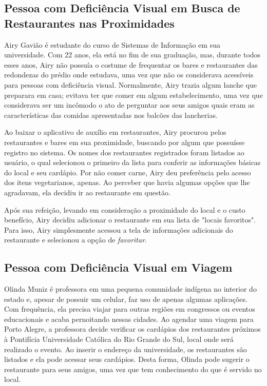 \subsection{Pessoa com Deficiência Visual em Busca de Restaurantes nas Proximidades}
Airy Gavião é estudante do curso de Sistemas de Informação em sua universidade. Com 22 anos, ela está no fim de sua graduação, mas, durante todos esses anos, Airy não possuía o costume de frequentar os bares e restaurantes das redondezas do prédio onde estudava, uma vez que não os considerava acessíveis para pessoas com deficiência visual. Normalmente, Airy trazia algum lanche que preparara em casa; evitava ter que comer em algum estabelecimento, uma vez que considerava ser um incômodo o ato de perguntar aos seus amigos quais eram as características das comidas apresentadas nos balcões das lancherias. 

Ao baixar o aplicativo de auxílio em restaurantes, Airy procurou pelos restaurantes e bares em sua proximidade, buscando por algum que possuísse registro no sistema. Os nomes dos restaurantes registrados foram listados ao usuário, o qual selecionou o primeiro da lista para conferir as informações básicas do local e seu cardápio. Por não comer carne, Airy deu preferência pelo acesso dos itens vegetarianos, apenas. Ao perceber que havia algumas opções que lhe agradavam, ela decidiu ir ao restaurante em questão.

Após sua refeição, levando em consideração a proximidade do local e o custo benefício, Airy decidiu adicionar o restaurante em sua lista de "locais favoritos". Para isso, Airy simplesmente acessou a tela de informações adicionais do restaurante e selecionou a opção de \emph{favoritar}.

\subsection{Pessoa com Deficiência Visual em Viagem}
Olinda Muniz é professora em uma pequena comunidade indígena no interior do estado e, apesar de possuir um celular, faz uso de apenas algumas aplicações. Com frequência, ela precisa viajar para outras regiões em congressos ou eventos educacionais e acaba pernoitando nessas cidades. Ao agendar uma viagem para Porto Alegre, a professora decide verificar os cardápios dos restaurantes próximos à Pontifícia Universidade Católica do Rio Grande do Sul, local onde será realizado o evento. Ao inserir o endereço da universidade, os  restaurantes são listados e ela pode acessar seus cardápios. Desta forma, Olinda pode sugerir o restaurante para seus amigos, uma vez que tem conhecimento do que é servido no local. 


